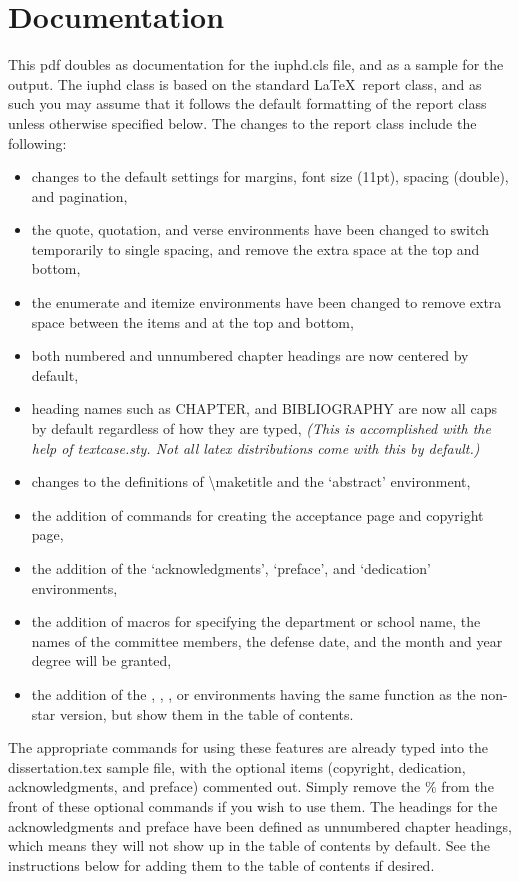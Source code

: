 \chapter{Documentation}

This pdf doubles as documentation for the iuphd.cls file, and as a sample for the output.
The iuphd class is based on the standard \LaTeX \ report class, and as such you may assume that it follows
the default formatting of the report class unless otherwise specified below.  The
changes to the report class include the following:

\begin{itemize}
 \item changes to the default settings for margins, font size (11pt), spacing (double), and pagination,
 \item the quote, quotation, and verse environments have been changed to switch temporarily to single spacing, and
       remove the extra space at the top and bottom,
 \item the enumerate and itemize environments have been changed to remove extra space between the items and at the
       top and bottom,
 \item both numbered and unnumbered chapter headings are now centered by default,
 \item heading names such as CHAPTER, and BIBLIOGRAPHY are now all caps by default regardless of how they are typed,
 \emph{(This is accomplished with the help of textcase.sty.  Not all latex distributions come with this by default.)}
 \item changes to the definitions of \textbackslash maketitle and the `abstract' environment,
 \item the addition of commands for creating the acceptance page and copyright page,
 \item the addition of the `acknowledgments', `preface', and `dedication' environments,
 \item the addition of macros for specifying the department or school name, the names of
 the committee members, the defense date, and the month and year degree will be granted,
 \item the addition of the , , , or  environments having the same function as the non-star version, but show them in the table of contents.
\end{itemize}

The appropriate commands for using these features are already typed into the dissertation.tex sample file,
with the optional items (copyright, dedication, acknowledgments, and preface) commented out.  Simply remove the \% from the front
of these optional commands if you wish to use them.  The headings for the acknowledgments and preface have
been defined as unnumbered chapter headings, which means they will not show up in the table of contents by default.
See the instructions below for adding them to the table of contents if desired.

